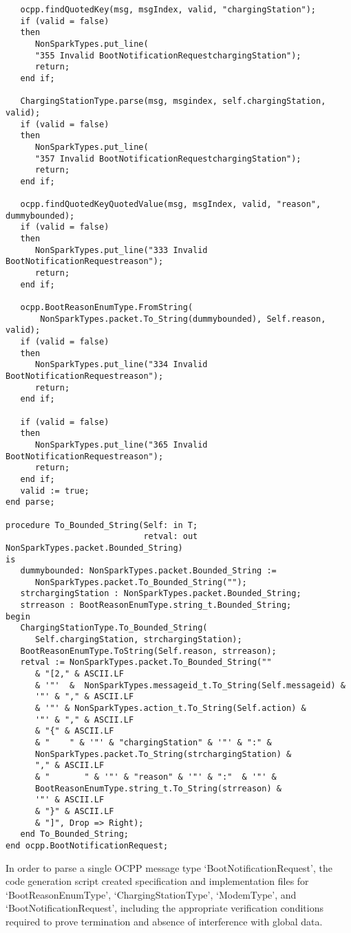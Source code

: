 \documentclass[12pt,openany,a4paper]{book}
\begin{document}
\begin{verbatim}
   ocpp.findQuotedKey(msg, msgIndex, valid, "chargingStation");
   if (valid = false) 
   then 
      NonSparkTypes.put_line(
      "355 Invalid BootNotificationRequestchargingStation"); 
      return; 
   end if;

   ChargingStationType.parse(msg, msgindex, self.chargingStation, valid);
   if (valid = false) 
   then 
      NonSparkTypes.put_line(
      "357 Invalid BootNotificationRequestchargingStation"); 
      return; 
   end if;

   ocpp.findQuotedKeyQuotedValue(msg, msgIndex, valid, "reason", dummybounded);
   if (valid = false) 
   then 
      NonSparkTypes.put_line("333 Invalid BootNotificationRequestreason"); 
      return; 
   end if;

   ocpp.BootReasonEnumType.FromString(
       NonSparkTypes.packet.To_String(dummybounded), Self.reason, valid);
   if (valid = false) 
   then 
      NonSparkTypes.put_line("334 Invalid BootNotificationRequestreason"); 
      return; 
   end if;

   if (valid = false) 
   then 
      NonSparkTypes.put_line("365 Invalid BootNotificationRequestreason"); 
      return; 
   end if;
   valid := true;
end parse;

procedure To_Bounded_String(Self: in T;
                            retval: out NonSparkTypes.packet.Bounded_String)
is
   dummybounded: NonSparkTypes.packet.Bounded_String := 
      NonSparkTypes.packet.To_Bounded_String(""); 
   strchargingStation : NonSparkTypes.packet.Bounded_String;
   strreason : BootReasonEnumType.string_t.Bounded_String;
begin
   ChargingStationType.To_Bounded_String(
      Self.chargingStation, strchargingStation);
   BootReasonEnumType.ToString(Self.reason, strreason);
   retval := NonSparkTypes.packet.To_Bounded_String(""
      & "[2," & ASCII.LF
      & '"'  &  NonSparkTypes.messageid_t.To_String(Self.messageid) & 
      '"' & "," & ASCII.LF
      & '"' & NonSparkTypes.action_t.To_String(Self.action) & 
      '"' & "," & ASCII.LF
      & "{" & ASCII.LF
      & "    " & '"' & "chargingStation" & '"' & ":" & 
      NonSparkTypes.packet.To_String(strchargingStation) & 
      "," & ASCII.LF
      & "       " & '"' & "reason" & '"' & ":"  & '"' & 
      BootReasonEnumType.string_t.To_String(strreason) & 
      '"' & ASCII.LF
      & "}" & ASCII.LF
      & "]", Drop => Right);
   end To_Bounded_String;
end ocpp.BootNotificationRequest;
\end{verbatim}

In order to parse a single OCPP message type `BootNotificationRequest', the code generation script created specification and implementation files for `BootReasonEnumType', `ChargingStationType', `ModemType', and `BootNotificationRequest', including the appropriate verification conditions required to prove termination and absence of interference with global data.
\end{document}
